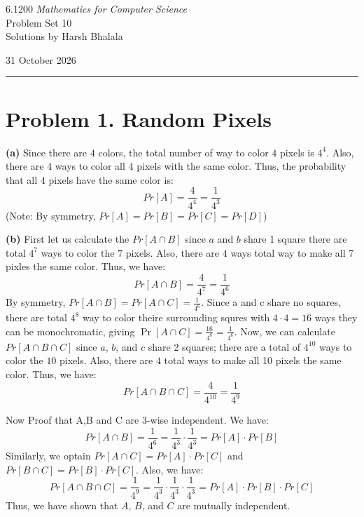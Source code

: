 \documentclass{article}
\begin{document}
\noindent
\begin{minipage}[t]{0.68\textwidth}
{\large 6.1200 \textit{Mathematics for Computer Science}}\\[4pt]
{\large Problem Set 10}\\[4pt]
{\large Solutions by Harsh Bhalala}
\end{minipage}%
\hfill
\begin{minipage}[t]{0.27\textwidth}
\raggedleft
{\large 31 October 2026}
\end{minipage}

\vspace{6pt}

\noindent\rule{\textwidth}{0.5pt}

\section*{Problem 1. Random Pixels}

\textbf{(a)} Since there are $4$ colors, the total number of way to color $4$ pixels is $4^4$. Also, there are $4$ ways to color all $4$ pixels with the same color.
Thus, the probability that all $4$ pixels have the same color is:
\[Pr[A] = \frac{4}{4^4} = \frac{1}{4^3} \]
(Note: By symmetry, $Pr[A] = Pr[B] = Pr[C] = Pr[D]$)

\vspace{\baselineskip}
\noindent\textbf{(b)} First let us calculate the $Pr[A \cap B]$ since $a$ and $b$ share 1 square there are total $4^7$ ways to color the
$7$ pixels. Also, there are $4$ ways total way to make all 7 pixles the same color. Thus, we have:
\[Pr[A \cap B] = \frac{4}{4^7} = \frac{1}{4^6} \]
By symmetry, $Pr[A \cap B] = Pr[A \cap C] = \frac{1}{4^6}$. Since a and c share no squares, there are total $4^8$ way to color theire surrounding
squres with $4 \cdot 4 = 16$ ways they can be monochromatic, giving $\Pr[A \cap C] = \frac{16}{4^8} = \frac{1}{4^6}$.
Now, we can calculate $Pr[A \cap B \cap C]$ since $a$, $b$, and $c$ share 2 squares; there are a total of $ 4^ {10} $ ways to color the $10$ pixels. Also, there are $4$ total ways to make all 10 pixels the same color. Thus, we have:
\[Pr[A \cap B \cap C] = \frac{4}{4^{10}} = \frac{1}{4^9}\]

Now Proof that A,B and C are 3-wise independent. We have:
\[Pr[A \cap B] = \frac{1}{4^6} = \frac{1}{4^3} \cdot \frac{1}{4^3} = Pr[A] \cdot Pr[B] \]
Similarly, we optain $Pr[A \cap C] = Pr[A] \cdot Pr[C]$ and $Pr[B \cap C] = Pr[B] \cdot Pr[C]$.
Also, we have:
\[Pr[A \cap B \cap C] = \frac{1}{4^9} = \frac{1}{4^3} \cdot \frac{1}{4^3} \cdot \frac{1}{4^3} = Pr[A] \cdot Pr[B] \cdot Pr[C] \]
Thus, we have shown that $A$, $B$, and $C$ are mutually independent.
\end{document}
